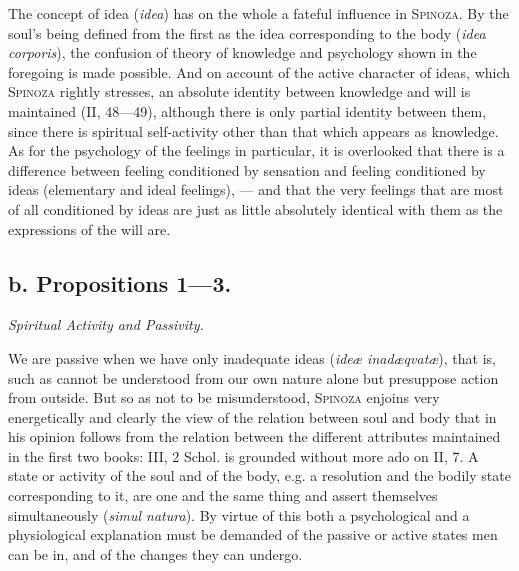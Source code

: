 \documentclass[12pt]{article}
\begin{document}
The concept of idea (\textit{idea}) has on the whole a fateful influence in \textsc{Spinoza}.
By the soul's being defined from the first as the idea corresponding to the body (\textit{idea
corporis}), the confusion of theory of knowledge and psychology shown in the foregoing is made
possible. And on account of the active character of ideas, which \textsc{Spinoza} rightly
stresses, an absolute identity between knowledge and will is maintained (II, 48---49),
although there is only partial identity between them, since there is spiritual self-activity
other than that which appears as knowledge. As for the psychology of the feelings in
particular, it is overlooked that there is a difference between feeling conditioned by
sensation and feeling conditioned by ideas (elementary and ideal feelings), --- and that the
very feelings that are most of all conditioned by ideas are just as little absolutely identical
with them as the expressions of the will are.

\subsection*{b. Propositions 1---3.}
\begin{center}\textit{Spiritual Activity and Passivity.}\end{center}

We are passive when we have only inadequate ideas (\textit{ideæ inadæqvatæ}), that is, such as
cannot be understood from our own nature alone but presuppose action from outside. But so as not
to be misunderstood, \textsc{Spinoza} enjoins very energetically and clearly the view of the
relation between soul and body that in his opinion follows from the relation between the
different attributes maintained in the first two books: III, 2 Schol. is grounded without more
ado on II, 7. A state or activity of the soul and of the body, e.g. a resolution and the bodily
state corresponding to it, are one and the same thing and assert themselves simultaneously
(\textit{simul natura}). By virtue of this both a psychological and a physiological explanation
must be demanded of the passive or active states men can be in, and of the changes they can
undergo.
\end{document}
